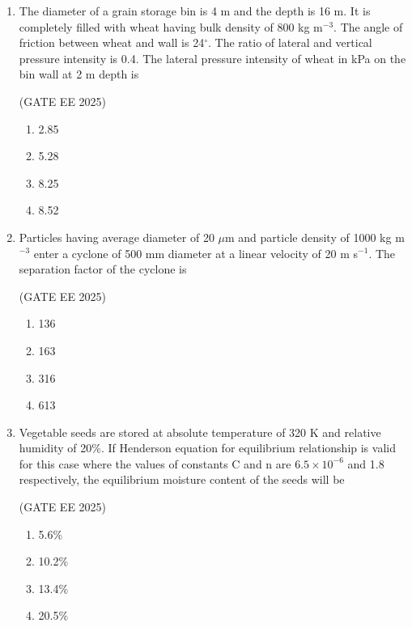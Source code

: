 \documentclass[journal,12pt,onecolumn]{IEEEtran}
\theoremstyle{remark}
\begin{document}
\begin{enumerate}
\item The diameter of a grain storage bin is 4 m and the depth is 16 m. It is completely filled with wheat having bulk density of 800 kg m$^{-3}$. The angle of friction between wheat and wall is 24$^\circ$. The ratio of lateral and vertical pressure intensity is 0.4. The lateral pressure intensity of wheat in kPa on the bin wall at 2 m depth is

\hfill(GATE EE 2025)

\begin{multicols}{4}
\begin{enumerate}
\item 2.85
\item 5.28
\item 8.25
\item 8.52
\end{enumerate}
\end{multicols}

\item Particles having average diameter of 20 $\mu$m and particle density of 1000 kg m$^{-3}$ enter a cyclone of 500 mm diameter at a linear velocity of 20 m s$^{-1}$. The separation factor of the cyclone is

\hfill(GATE EE 2025)

\begin{multicols}{4}
\begin{enumerate}
\item 136
\item 163
\item 316
\item 613
\end{enumerate}
\end{multicols}

\item Vegetable seeds are stored at absolute temperature of 320 K and relative humidity of 20\%. If Henderson equation for equilibrium relationship is valid for this case where the values of constants C and n are $6.5 \times 10^{-6}$ and 1.8 respectively, the equilibrium moisture content of the seeds will be

\hfill(GATE EE 2025)

\begin{multicols}{4}
\begin{enumerate}
\item 5.6\%
\item 10.2\%
\item 13.4\%
\item 20.5\%
\end{enumerate}
\end{multicols}


\end{enumerate}
\end{document}
